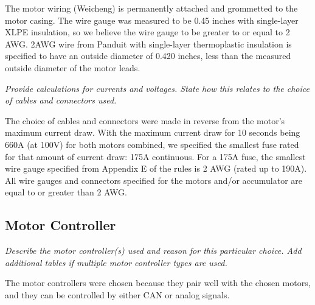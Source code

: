\documentclass{article}
\begin{document}
    The motor wiring (Weicheng) is permanently attached and grommetted to the motor casing. The wire gauge was measured to be 0.45 inches with single-layer XLPE insulation, so we believe the wire gauge to be greater to or equal to 2 AWG. 2AWG wire from Panduit with single-layer thermoplastic insulation is specified to have an outside diameter of 0.420 inches, less than the measured outside diameter of the motor leads.

    \textit{Provide calculations for currents and voltages. State how this relates to the choice of cables and connectors used.}

    The choice of cables and connectors were made in reverse from the motor's maximum current draw. With the maximum current draw for 10 seconds being 660A (at 100V) for both motors combined, we specified the smallest fuse rated for that amount of current draw: 175A continuous. For a 175A fuse, the smallest wire gauge specified from Appendix E of the rules is 2 AWG (rated up to 190A). All wire gauges and connectors specified for the motors and/or accumulator are equal to or greater than 2 AWG.

    \subsection{Motor Controller}

    \textit{Describe the motor controller(s) used and reason for this particular choice. Add additional tables if multiple motor controller types are used.}

    The motor controllers were chosen because they pair well with the chosen motors, and they can be controlled by either CAN or analog signals.
\end{document}
